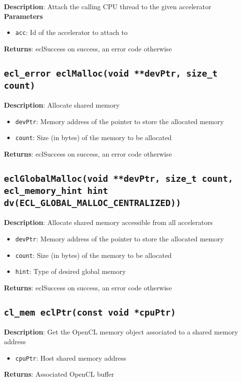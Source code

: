 \textbf{Description}: Attach the calling CPU thread to the given accelerator
\textbf{Parameters}
\begin{itemize}
  \item \texttt{acc}: Id of the accelerator to attach to
\end{itemize}
\textbf{Returns}: eclSuccess on success, an error code otherwise

\subsection{\texttt{ecl\_error eclMalloc(void **devPtr, size\_t count)}}

\textbf{Description}: Allocate shared memory
\begin{itemize}
  \item \texttt{devPtr}: Memory address of the pointer to store the allocated memory
  \item \texttt{count}: Size (in bytes) of the memory to be allocated
\end{itemize}
\textbf{Returns}: eclSuccess on success, an error code otherwise

\subsection{\texttt{eclGlobalMalloc(void **devPtr, size\_t count, ecl\_memory\_hint hint dv(ECL\_GLOBAL\_MALLOC\_CENTRALIZED))}}

\textbf{Description}: Allocate shared memory accessible from all accelerators
\begin{itemize}
  \item \texttt{devPtr}: Memory address of the pointer to store the allocated memory
  \item \texttt{count}: Size (in bytes) of the memory to be allocated
  \item \texttt{hint}: Type of desired global memory
\end{itemize}
\textbf{Returns}: eclSuccess on success, an error code otherwise

\subsection{\texttt{cl\_mem eclPtr(const void *cpuPtr)}}

\textbf{Description}: Get the OpenCL memory object associated to a shared memory address
\begin{itemize}
  \item \texttt{cpuPtr}: Host shared memory address
\end{itemize}
\textbf{Returns}: Associated OpenCL buffer

